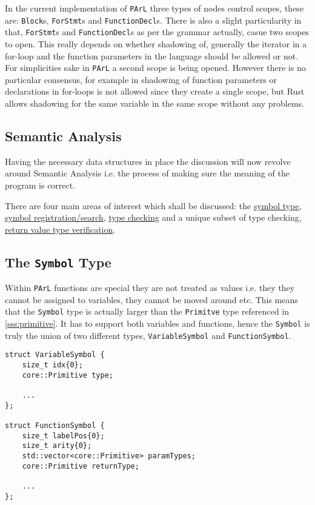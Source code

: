 In the current implementation of \texttt{PArL} three types of
nodes control scopes, these are: \texttt{Block}s,
\texttt{ForStmt}s and \texttt{FunctionDecl}s. There is also a
slight particularity in that, \texttt{ForStmt}s and
\texttt{FunctionDecl}s as per the grammar actually, casue two
scopes to open. This really depends on whether shadowing of,
generally the iterator in a for-loop and the function parameters
in the language should be allowed or not. For simplicities sake
in \texttt{PArL} a second scope is being opened. However there
is no particular consensus, for example in \CC{} shadowing of
function parameters or declarations in for-loops is not allowed
since they create a single scope, but Rust allows shadowing for
the same variable in the same scope without any problems.

\subsection{Semantic Analysis}

Having the necessary data structures in place the discussion
will now revolve around Semantic Analysis i.e. the process of
making sure the meaning of the program is correct.

There are four main areas of interest which shall be discussed:
the \ul{symbol type}, \ul{symbol registration/search}, \ul{type
checking} and a unique subset of type checking, \ul{return value
type verification}.

\subsection{The \texttt{Symbol} Type}

Within \texttt{PArL} functions are special they are not treated
as values i.e. they they cannot be assigned to variables, they
cannot be moved around etc. This means that the \texttt{Symbol}
type is actually larger than the \texttt{Primitve} type
referenced in \ref{sss:primitive}. It has to support both
variables and functions, hence the \texttt{Symbol} is truly the
union of two different types, \texttt{VariableSymbol} and
\texttt{FunctionSymbol}.

\begin{lstlisting}[caption={Definitions of
\texttt{VariableSymbol} and \texttt{FunctionSymbol}
(backend/Symbol.hpp)},label=lst:symbols]
struct VariableSymbol {
    size_t idx{0};
    core::Primitive type;

    ...
};

struct FunctionSymbol {
    size_t labelPos{0};
    size_t arity{0};
    std::vector<core::Primitive> paramTypes;
    core::Primitive returnType;

    ...
};
\end{lstlisting}


